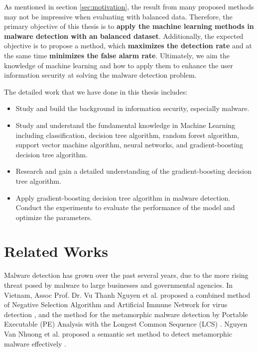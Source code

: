 As mentioned in section \ref{sec:motivation}, the result from many proposed methods may not be impressive when evaluating with balanced data. 
Therefore, the primary objective of this thesis is to \textbf{apply the machine learning methods in malware detection with an balanced dataset}.
Additionally, the expected objective is to propose a method, which \textbf{maximizes the detection rate} and at the same time \textbf{minimizes the false alarm rate}. 
Ultimately, we aim the knowledge of machine learning and how to apply them to enhance the user information security at solving the malware detection problem. 

The detailed work that  we have done in this thesis includes:
\begin{itemize}
    \item Study and build the background in information security, especially malware.
    \item Study and understand the fundamental knowledge in Machine  Learning including classification, decision tree algorithm, random forest algorithm, support vector machine algorithm, neural networks, and gradient-boosting decision tree algorithm. 
    \item Research and gain a detailed understanding of the gradient-boosting decision tree algorithm.
    \item Apply gradient-boosting decision tree algorithm in malware detection. Conduct the experiments to evaluate the performance of the model and optimize the parameters.
\end{itemize}

\section{Related Works}

Malware detection has grown over the past several years, due to the more rising threat posed by malware to large businesses and governmental agencies. 
In Vietnam, Assoc Prof. Dr. Vu Thanh Nguyen et al. proposed a combined method of Negative Selection Algorithm and Artificial Immune Network for virus detection \cite{nguyen2014combination}, and the method for the metamorphic malware detection by Portable Executable (PE) Analysis with the Longest Common Sequence (LCS) \cite{vu2017metamorphic}.
Nguyen Van Nhuong et al. proposed a semantic set method to detect metamorphic malware effectively \cite{van2014semantic}.

